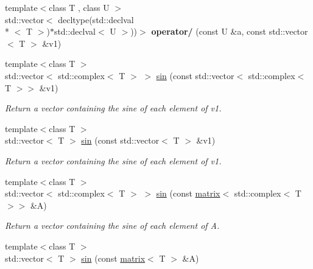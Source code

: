 \begin{DoxyCompactItemize}
\item 
\hypertarget{namespacekeycpp_a4d18510a87d417d5c38f24ded26a8cee}{{\footnotesize template$<$class T , class U $>$ }\\std\-::vector$<$ decltype(std\-::declval\\*
$<$ T $>$)$\ast$std\-::declval$<$ U $>$))$>$ {\bfseries operator/} (const U \&a, const std\-::vector$<$ T $>$ \&v1)}\label{namespacekeycpp_a4d18510a87d417d5c38f24ded26a8cee}

\item 
\hypertarget{namespacekeycpp_a60d3f3c9d269e14b23609d754684cdcf}{{\footnotesize template$<$class T $>$ }\\std\-::vector$<$ std\-::complex$<$ T $>$ $>$ \hyperlink{namespacekeycpp_a60d3f3c9d269e14b23609d754684cdcf}{sin} (const std\-::vector$<$ std\-::complex$<$ T $>$$>$ \&v1)}\label{namespacekeycpp_a60d3f3c9d269e14b23609d754684cdcf}

\begin{DoxyCompactList}\small\item\em Return a vector containing the sine of each element of v1. \end{DoxyCompactList}\item 
\hypertarget{namespacekeycpp_a56636d37802b9237f0e09690307cacef}{{\footnotesize template$<$class T $>$ }\\std\-::vector$<$ T $>$ \hyperlink{namespacekeycpp_a56636d37802b9237f0e09690307cacef}{sin} (const std\-::vector$<$ T $>$ \&v1)}\label{namespacekeycpp_a56636d37802b9237f0e09690307cacef}

\begin{DoxyCompactList}\small\item\em Return a vector containing the sine of each element of v1. \end{DoxyCompactList}\item 
\hypertarget{namespacekeycpp_a7d66a7287374d8e1e685538e0363101e}{{\footnotesize template$<$class T $>$ }\\std\-::vector$<$ std\-::complex$<$ T $>$ $>$ \hyperlink{namespacekeycpp_a7d66a7287374d8e1e685538e0363101e}{sin} (const \hyperlink{classkeycpp_1_1matrix}{matrix}$<$ std\-::complex$<$ T $>$$>$ \&A)}\label{namespacekeycpp_a7d66a7287374d8e1e685538e0363101e}

\begin{DoxyCompactList}\small\item\em Return a vector containing the sine of each element of A. \end{DoxyCompactList}\item 
\hypertarget{namespacekeycpp_a0dd3aac5066a4d3e2c7108b26c554605}{{\footnotesize template$<$class T $>$ }\\std\-::vector$<$ T $>$ \hyperlink{namespacekeycpp_a0dd3aac5066a4d3e2c7108b26c554605}{sin} (const \hyperlink{classkeycpp_1_1matrix}{matrix}$<$ T $>$ \&A)}\label{namespacekeycpp_a0dd3aac5066a4d3e2c7108b26c554605}


\end{DoxyCompactItemize}

